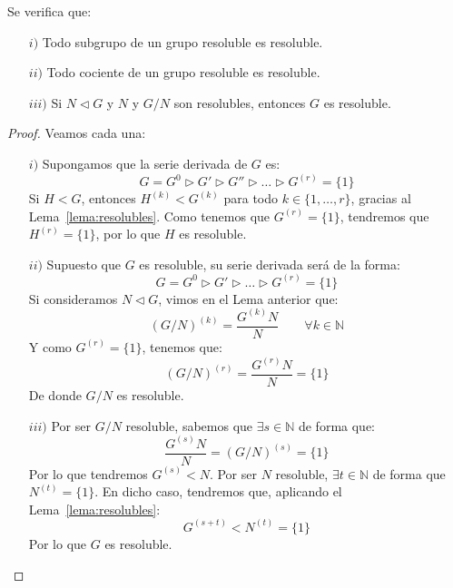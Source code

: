 \begin{prop}
    Se verifica que:
    \begin{enumerate}
        \item[$i)$] Todo subgrupo de un grupo resoluble es resoluble.
        \item[$ii)$] Todo cociente de un grupo resoluble es resoluble.
        \item[$iii)$] Si $N\lhd G$ y $N$ y $G/N$ son resolubles, entonces $G$ es resoluble.
    \end{enumerate}
    \begin{proof}
        Veamos cada una:
        \begin{enumerate}
            \item[$i)$] Supongamos que la serie derivada de $G$ es:
                \begin{equation*}
                    G = G^0 \rhd G' \rhd G '' \rhd \ldots \rhd G^{(r)} = \{1\}
                \end{equation*}
                Si $H<G$, entonces $H^{(k)} < G^{(k)}$ para todo $k \in \{1,\ldots,r\}$, gracias al Lema~\ref{lema:resolubles}. Como tenemos que $G^{(r)} = \{1\}$, tendremos que $H^{(r)} = \{1\}$, por lo que $H$ es resoluble.
            \item[$ii)$] Supuesto que $G$ es resoluble, su serie derivada será de la forma:
                \begin{equation*}
                    G = G^0 \rhd G' \rhd  \ldots \rhd G^{(r)} = \{1\}
                \end{equation*}
                Si consideramos $N\lhd G$, vimos en el Lema anterior que:
                \begin{equation*}
                    {(G/N)}^{(k)} = \dfrac{G^{(k)}N}{N} \qquad \forall k\in \mathbb{N}
                \end{equation*}
                Y como $G^{(r)} = \{1\}$, tenemos que:
                \begin{equation*}
                    {(G/N)}^{(r)} = \dfrac{G^{(r)}N}{N} = \{1\}
                \end{equation*}
                De donde $G/N$ es resoluble.
            \item[$iii)$] Por ser $G/N$ resoluble, sabemos que $\exists s\in \mathbb{N}$ de forma que:
                \begin{equation*}
                    \dfrac{G^{(s)}N}{N} = {(G/N)}^{(s)} = \{1\}
                \end{equation*}
                Por lo que tendremos $G^{(s)} < N$. Por ser $N$ resoluble, $\exists t\in \mathbb{N}$ de forma que $N^{(t)} =\{1\}$. En dicho caso, tendremos que, aplicando el Lema~\ref{lema:resolubles}:
                \begin{equation*}
                    G^{(s+t)} < N^{(t)} = \{1\}
                \end{equation*}
                Por lo que $G$ es resoluble.\qedhere
        \end{enumerate}
    \end{proof}
\end{prop}

